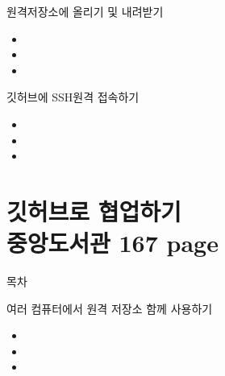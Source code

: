 \documentclass[aspectratio=1610,20pt,xcolor=pdftex,dvipsnames,table,handout]{beamer}
\begin{document}
		\begin{frame} [t,plain]
			\begin{block} {원격저장소에 올리기 및 내려받기}
			\setlength{\leftmargini}{1em}			
			\begin{itemize}
				\item 	
				\item 	
				\item 	
			\end{itemize}
			\end{block}						
		\end{frame}						

		\begin{frame} [t,plain]
			\begin{block} {깃허브에 SSH원격 접속하기 }
			\setlength{\leftmargini}{1em}			
			\begin{itemize}
				\item 	
				\item 	
				\item 	
			\end{itemize}
			\end{block}						
		\end{frame}						


		\begin{frame} [t,plain]
		\end{frame}						


		\part{깃허브로 협업하기 \\중앙도서관 167 page }
		\frame{\partpage}

\label{part1} 	%

		\begin{frame} [plain]{목차}
		\tableofcontents%
		\end{frame}


		\begin{frame} [t,plain]
			\begin{block} {여러 컴퓨터에서 원격 저장소 함께 사용하기}
			\setlength{\leftmargini}{1em}			
			\begin{itemize}
				\item 	
				\item 	
				\item 	
			\end{itemize}
			\end{block}						
		\end{frame}						
\end{document}
